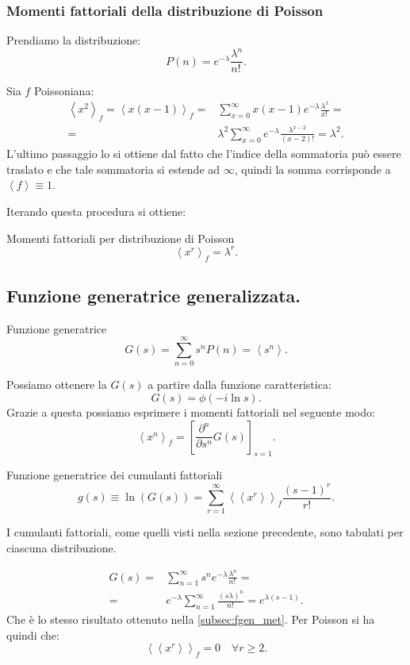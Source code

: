 \subsubsection{Momenti fattoriali della distribuzione di Poisson}%
\label{subsub:Momenti fattoriali della distribuzione di Poisson}
Prendiamo la distribuzione:
\[
	P(n) = e^{-\lambda } \frac{\lambda^n}{n!\,}
.\] 
\begin{exmp}[Poisson con $r=2$.]
    Sia $f$ Poissoniana:
   \[\begin{aligned}
       \left<x^2\right>_f=\left<x\left(x-1\right)\right>_f =& \sum_{x = 0}^{\infty} x\left(x-1\right)e^{-\lambda} \frac{\lambda^x}{x!\,} = \\
       =& \lambda^2 \sum_{x = 0}^{\infty}  e^{-\lambda} \frac{\lambda^{x-2}}{\left(x-2\right)!} = \lambda^2
   .\end{aligned}\]
   L'ultimo passaggio lo si ottiene dal fatto che l'indice della sommatoria può essere traslato e che tale sommatoria si estende ad $\infty$, quindi la somma corrisponde a $\left<f\right> \equiv 1$.
\end{exmp}
\noindent
Iterando questa procedura si ottiene:
\begin{bluebox}{Momenti fattoriali per distribuzione di Poisson}
 \[
    \left<x^r\right>_f = \lambda^r
.\]    
\end{bluebox}
\noindent

\subsection{Funzione generatrice generalizzata.}%
\label{subsub:Funzione generatrice generalizzata.}

\begin{redbox}{Funzione generatrice}
    \[
	G(s) = \sum_{n=0}^{\infty} s^n P(n) = \left<s^n\right>
    .\] 
\end{redbox}
\noindent
Possiamo ottenere la $G(s)$ a partire dalla funzione caratteristica:
\[
    G(s) = \phi (-i\ln s) 
.\] 
Grazie a questa possiamo esprimere i momenti fattoriali nel seguente modo:
\[
    \left<x^n\right>_f = \left[\frac{\partial^n}{\partial s^n} G(s)\right]_{s=1}
.\] 
\begin{bluebox}{Funzione generatrice dei cumulanti fattoriali}
    \[
	g(s) \equiv \ln (G(s)) = \sum_{r=1}^{\infty} \left<\left<x^r\right>\right>_f \frac{\left(s-1\right)^r}{r!}
    .\] 
\end{bluebox}
\noindent
I cumulanti fattoriali, come quelli visti nella sezione precedente, sono tabulati per ciascuna distribuzione.
\begin{exmp}
    \[\begin{aligned}
	G(s) =& \sum_{n=1}^{\infty} s^n e^{-\lambda} \frac{\lambda^n}{n!\,} =\\
	=& e^{-\lambda}\sum_{n=1}^{\infty} \frac{\left(s\lambda\right)^n}{n!\,} =  e^{\lambda (s-1) }
     .\end{aligned}\]
     Che è lo stesso risultato ottenuto nella \ref{subsec:fgen_met}.
     Per Poisson si ha quindi che:
     \[
         \left<\left<x^r\right>\right>_f = 0 \quad \forall r \ge  2
     .\] 
\end{exmp}
\noindent
\clearpage

